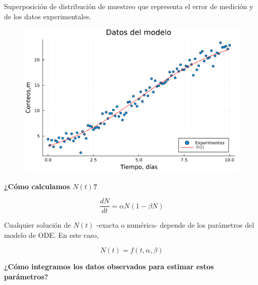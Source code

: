 \documentclass[11pt]{beamer}
\begin{document}
\begin{frame}

Superposición de distribución de muestreo que representa el error de medición y de los datos experimentales.

	\begin{figure}
		\includegraphics[scale=0.5]{images/bacterias_modelo_experimentos.pdf}
	\end{figure}
\end{frame}

\begin{frame}




\begin{center}
	\textbf{¿Cómo calculamos $N(t)$?}
\end{center}

		\[\dfrac{dN}{dt} = \alpha N (1-\beta N)\]

\end{frame}

\begin{frame}

Cualquier solución de $N(t)$ -exacta o numérica- depende de los parámetros del modelo de ODE. En este caso,

\[N(t) = f(t,\alpha,\beta)\]

\begin{center}
	\textbf{¿Cómo integramos los datos observados para estimar estos parámetros?}
\end{center}

\end{frame}
\end{document}
